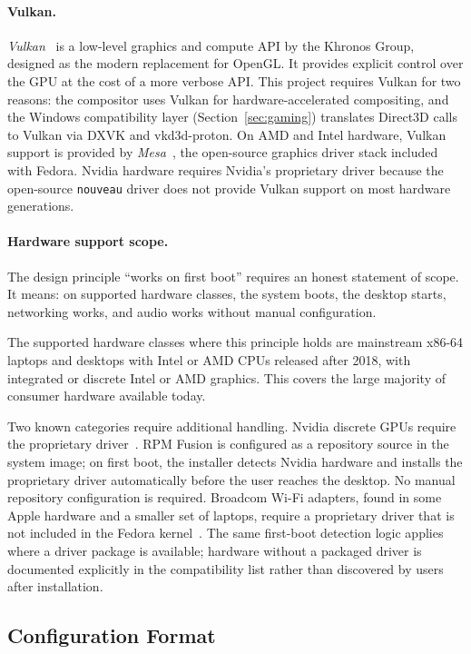 \paragraph{Vulkan.}
\emph{Vulkan}~\cite{vulkan} is a low-level graphics and
compute API by the Khronos Group, designed as the modern replacement for OpenGL.
It provides explicit control over the GPU at the cost of a more verbose API.
This project requires Vulkan for two reasons: the compositor uses Vulkan
for hardware-accelerated compositing, and the Windows compatibility layer
(Section~\ref{sec:gaming}) translates Direct3D calls to Vulkan via DXVK and
vkd3d-proton. On AMD and Intel hardware, Vulkan support is provided by
\emph{Mesa}~\cite{mesa}, the open-source graphics
driver stack included with Fedora. Nvidia hardware requires
Nvidia's proprietary driver because the open-source \texttt{nouveau} driver does
not provide Vulkan support on most hardware generations.

\paragraph{Hardware support scope.}
The design principle ``works on first boot'' requires an honest statement of
scope. It means: on supported hardware classes, the system boots, the desktop
starts, networking works, and audio works without manual configuration.

The supported hardware classes where this principle holds are mainstream x86-64
laptops and desktops with Intel or AMD CPUs released after 2018, with
integrated or discrete Intel or AMD graphics. This covers the large majority
of consumer hardware available today.

Two known categories require additional handling. Nvidia discrete GPUs require
the proprietary driver~\cite{fedora:nvidia}. RPM Fusion is configured as a
repository source in the system image; on first boot, the installer detects
Nvidia hardware and installs the proprietary driver automatically before the
user reaches the desktop. No manual repository configuration is required.
Broadcom Wi-Fi adapters, found in some Apple hardware and a smaller set of
laptops, require a proprietary driver that is not included in the Fedora
kernel~\cite{fedora:broadcom}. The same first-boot detection logic applies
where a driver package is available; hardware without a packaged driver is
documented explicitly in the compatibility list rather than discovered by
users after installation.

\subsection{Configuration Format}
\label{sec:config}

